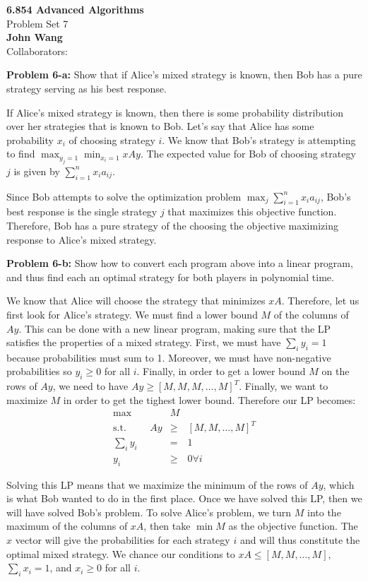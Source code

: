 \documentclass[psamsfonts]{amsart}
\newenvironment{sol}{\vspace{0.25cm}{\large \bfseries Solution:}}{\qedsymbol}
\newenvironment{prob}[1]{\begin{framed}{\large \bfseries Problem #1:}}{\end{framed}}
\newcommand{\makenewtitle}{
    \begin{center}
    {\huge \bfseries 6.854 Advanced Algorithms} \\
    Problem Set 7\\
    \vspace{0.25cm}
    {\bfseries John Wang} \\
    Collaborators: 
    \end{center}
    \vspace{0.5cm}
}
\begin{document}
\newpage
\makenewtitle

\begin{prob}{6-a}
Show that if Alice's mixed strategy is known, then Bob has a pure strategy serving as his best response.
\end{prob}
\begin{sol}
If Alice's mixed strategy is known, then there is some probability distribution over her strategies that is known to Bob. Let's say that Alice has some probability $x_i$ of choosing strategy $i$. We know that Bob's strategy is attempting to find $\max_{y_j = 1} \min_{x_i = 1} xAy$. The expected value for Bob of choosing strategy $j$ is given by $\sum_{i=1}^n x_i a_{ij}$. 

Since Bob attempts to solve the optimization problem $\max_{j} \sum_{i=1}^n x_i a_{ij}$, Bob's best response is the single strategy $j$ that maximizes this objective function. Therefore, Bob has a pure strategy of the choosing the objective maximizing response to Alice's mixed strategy.
\end{sol}

\begin{prob}{6-b}
Show how to convert each program above into a linear program, and thus find each an optimal strategy for both players in polynomial time.
\end{prob}
\begin{sol}
We know that Alice will choose the strategy that minimizes $xA$. Therefore, let us first look for Alice's strategy. We must find a lower bound $M$ of the columns of $Ay$. This can be done with a new linear program, making sure that the LP satisfies the properties of a mixed strategy. First, we must have $\sum_{i} y_i = 1$ because probabilities must sum to 1. Moreover, we must have non-negative probabilities so $y_i \geq 0$ for all $i$. Finally, in order to get a lower bound $M$ on the rows of $Ay$, we need to have $Ay \geq [M, M, M, \ldots, M]^T$. Finally, we want to maximize $M$ in order to get the tighest lower bound. Therefore our LP becomes:
\begin{eqnarray}
\max &M& \\ 
\text{s.t.} \hspace{1cm} Ay &\geq& [M, M, \ldots, M]^T \\
\sum_i y_i &=& 1 \\
y_i &\geq& 0 \forall i
\end{eqnarray}

Solving this LP means that we maximize the minimum of the rows of $Ay$, which is what Bob wanted to do in the first place. Once we have solved this LP, then we will have solved Bob's problem. To solve Alice's problem, we turn $M$ into the maximum of the columns of $xA$, then take $\min M$ as the objective function. The $x$ vector will give the probabilities for each strategy $i$ and will thus constitute the optimal mixed strategy. We chance our conditions to $xA \leq [M, M, \ldots, M]$, $\sum_{i} x_i = 1$, and $x_i \geq 0$ for all $i$.  
\end{sol}
\end{document}
